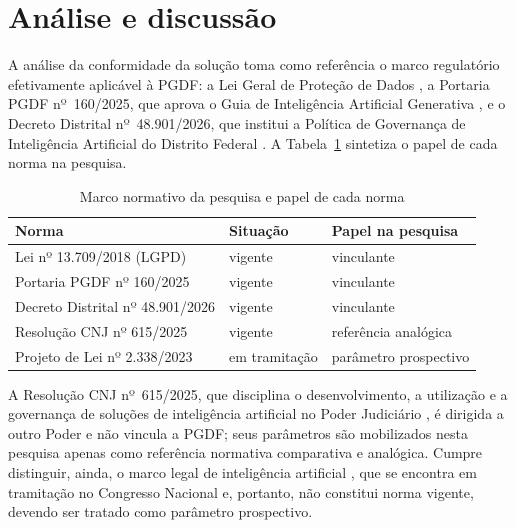 
\section{Análise e discussão}

A análise da conformidade da solução toma como referência o marco regulatório
efetivamente aplicável à PGDF: a Lei Geral de Proteção de Dados
\parencite{brasil2018lgpd}, a Portaria PGDF nº~160/2025, que aprova o Guia de
Inteligência Artificial Generativa \parencite{df2025portaria160}, e o Decreto
Distrital nº~48.901/2026, que institui a Política de Governança de
Inteligência Artificial do Distrito Federal \parencite{df2026decreto48901}. A
Tabela~\ref{tab:marco-normativo} sintetiza o papel de cada norma na pesquisa.

\begin{table}[htb]
  \caption{Marco normativo da pesquisa e papel de cada norma}
  \label{tab:marco-normativo}
  \centering
  \begin{tabular}{lll}
    \toprule
    \textbf{Norma} & \textbf{Situação} & \textbf{Papel na pesquisa} \\
    \midrule
    Lei nº 13.709/2018 (LGPD)        & vigente      & vinculante \\
    Portaria PGDF nº 160/2025        & vigente      & vinculante \\
    Decreto Distrital nº 48.901/2026 & vigente      & vinculante \\
    Resolução CNJ nº 615/2025        & vigente      & referência analógica \\
    Projeto de Lei nº 2.338/2023     & em tramitação & parâmetro prospectivo \\
    \bottomrule
  \end{tabular}
\end{table}

A Resolução CNJ nº~615/2025, que disciplina o desenvolvimento, a utilização e
a governança de soluções de inteligência artificial no Poder Judiciário
\parencite{cnj2025res615}, é dirigida a outro Poder e não vincula a PGDF; seus
parâmetros são mobilizados nesta pesquisa apenas como referência normativa
comparativa e analógica. Cumpre distinguir, ainda, o marco legal de
inteligência artificial \parencite{brasil2023pl2338}, que se encontra em
tramitação no Congresso Nacional e, portanto, não constitui norma vigente,
devendo ser tratado como parâmetro prospectivo.
